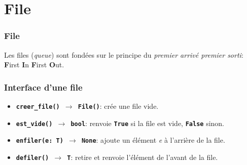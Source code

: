 \documentclass[svgnames,11pt]{beamer}
\begin{document}
\section{File}
\begin{frame}
    \frametitle{File}

    \begin{aretenir}[]
        Les files (\emph{queue}) sont fondées sur le principe du \emph{premier arrivé premier sorti}: \textbf{F}irst \textbf{I}n \textbf{F}irst \textbf{O}ut.
    \end{aretenir}

\end{frame}
\begin{frame}
    \frametitle{}

   \begin{center}
   \end{center} 

\end{frame}
\begin{frame}
    \frametitle{Interface d'une file}

    \begin{itemize}
        \item \texttt{\textbf{creer\_file() $\rightarrow$ File()}}: crée une file vide.
        \item \texttt{\textbf{est\_vide() $\rightarrow$ bool}}: renvoie \textbf{\texttt{True}} si la file est vide, \textbf{\texttt{False}} sinon.
        \item \texttt{\textbf{enfiler(e: T) $\rightarrow$ None}}: ajoute un élément \emph{e} à l'arrière de la file.
        \item \texttt{\textbf{defiler() $\rightarrow$ T}}: retire et renvoie l'élément de l'avant de la file.
        \end{itemize}

\end{frame}
\end{document}
